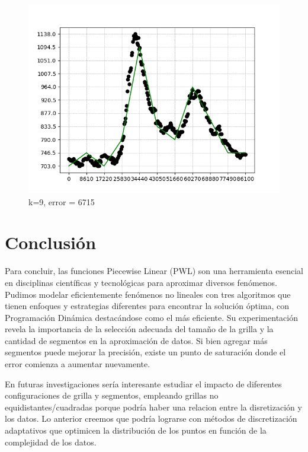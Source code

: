 \documentclass{article}
\begin{document}
\begin{figure}[h!]
\begin{minipage}{.3\textwidth}
            \includegraphics[width=.9\linewidth]{graficos/solution_11x11,9N_optimistic_instance.png}
            \caption{k=9, error = 6715}
          \end{minipage}%
    \end{figure}
    
\clearpage

\section{Conclusión}
    \vspace{0.5cm}

Para concluir, las funciones Piecewise Linear (PWL) son una herramienta esencial en disciplinas científicas y tecnológicas para aproximar diversos fenómenos. Pudimos modelar eficientemente fenómenos no lineales con tres algoritmos que tienen enfoques y estrategias diferentes para encontrar la solución óptima, con Programación Dinámica destacándose como el más eficiente. Su experimentación revela la importancia de la selección adecuada del tamaño de la grilla y la cantidad de segmentos en la aproximación de datos. Si bien agregar más segmentos puede mejorar la precisión, existe un punto de saturación donde el error comienza a aumentar nuevamente.

En futuras investigaciones sería interesante estudiar el impacto de diferentes configuraciones de grilla  y segmentos, empleando grillas no equidistantes/cuadradas porque podría haber una relacion entre la disretización y los datos. Lo anterior creemos que podría lograrse con métodos de discretización adaptativos que optimicen la distribución de los puntos en función de la complejidad de los datos.
    
\end{document}
